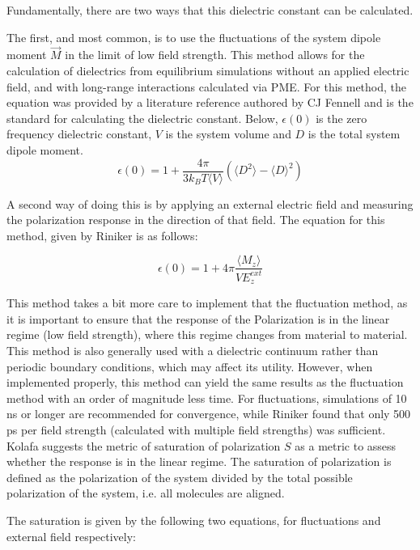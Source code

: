 \documentclass[9pt,bestpractices]{livecoms}
\begin{document}
Fundamentally, there are two ways that this dielectric constant can be calculated.

The first, and most common, is to use the fluctuations of the system dipole moment $\vec{M}$ in the limit of low field strength.  This method allows for the calculation of dielectrics from equilibrium simulations without an applied electric field, and with long-range interactions calculated via PME.  
For this method, the equation was provided by a literature reference authored by CJ Fennell\cite{dielec} and is the standard for calculating the dielectric constant. Below, $\epsilon(0)$ is the zero frequency dielectric constant, $V$ is the system volume and $D$ is the total system dipole moment. 
\begin{equation} \epsilon(0) = 1 + \frac{4 \pi}{3 k_B T \langle V \rangle}(\langle D^2 \rangle - \langle D \rangle^2) \end{equation}

A second way of doing this is by applying an external electric field and measuring the polarization response in the direction of that field. The equation for this method, given by Riniker \cite{dielec_riniker} is as follows:

\begin{equation} \epsilon(0) = 1 +4 \pi \frac{\langle M_z \rangle}{VE_z^{ext}}  \end{equation}

This method takes a bit more care to implement that the fluctuation method, as it is important to ensure that the response of the Polarization is in the linear regime (low field strength), where this regime changes from material to material.  This method is also generally used with a dielectric continuum rather than periodic boundary conditions, which may affect its utility.  However, when implemented properly, this method can yield the same results as the fluctuation method with an order of magnitude less time.  For fluctuations, simulations of 10 ns or longer are recommended for convergence, while Riniker\cite{dielec_riniker} found that only 500 ps per field strength (calculated with multiple field strengths) was sufficient.  Kolafa \cite{dielec_kolafa} suggests the metric of saturation of polarization $S$ as a metric to assess whether the response is in the linear regime.  The saturation of polarization is defined as the polarization of the system divided by the total possible polarization of the system, i.e. all molecules are aligned.  

The saturation is given by the following two equations, for fluctuations and external field respectively:
\end{document}
